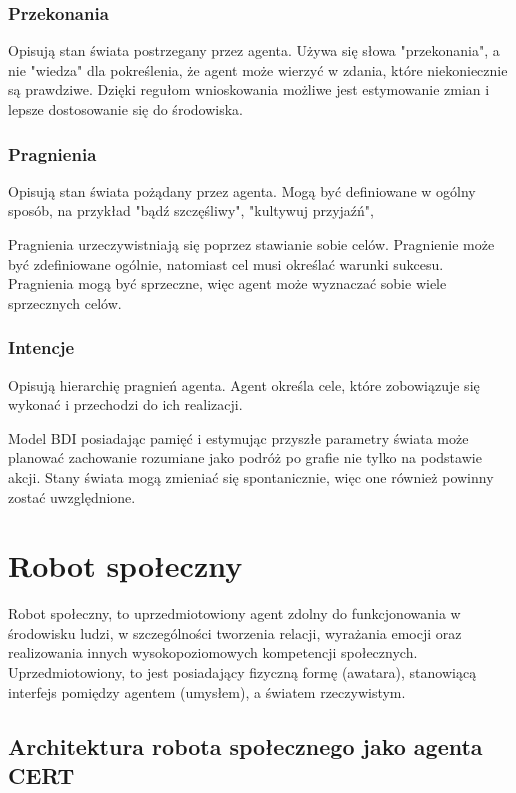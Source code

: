 \subsubsection{Przekonania}
Opisują stan świata postrzegany przez agenta. Używa się słowa "przekonania", a nie "wiedza" dla pokreślenia, że agent może wierzyć w zdania, które niekoniecznie są prawdziwe. Dzięki regułom wnioskowania możliwe jest estymowanie zmian i lepsze dostosowanie się do środowiska. 

\subsubsection{Pragnienia}
Opisują stan świata pożądany przez agenta. Mogą być definiowane w ogólny sposób, na przykład "bądź szczęśliwy", "kultywuj przyjaźń",

Pragnienia urzeczywistniają się poprzez stawianie sobie celów. Pragnienie może być zdefiniowane ogólnie, natomiast cel musi określać warunki sukcesu. Pragnienia mogą być sprzeczne, więc agent może wyznaczać sobie wiele sprzecznych celów. 

{\subsubsection{Intencje}
Opisują hierarchię pragnień agenta. Agent określa cele, które zobowiązuje się wykonać i przechodzi do ich realizacji. \\}



Model BDI posiadając pamięć i estymując przyszłe parametry świata może planować zachowanie rozumiane jako podróż po grafie nie tylko na podstawie akcji. Stany świata mogą zmieniać się spontanicznie, więc one również powinny zostać uwzględnione. 

\section{Robot społeczny}
Robot społeczny, to uprzedmiotowiony agent zdolny do funkcjonowania w środowisku ludzi, w szczególności tworzenia relacji, wyrażania emocji oraz realizowania innych wysokopoziomowych kompetencji społecznych. Uprzedmiotowiony, to jest posiadający fizyczną formę (awatara), stanowiącą interfejs pomiędzy agentem (umysłem), a światem rzeczywistym. 

\subsection{Architektura robota społecznego jako agenta CERT}

